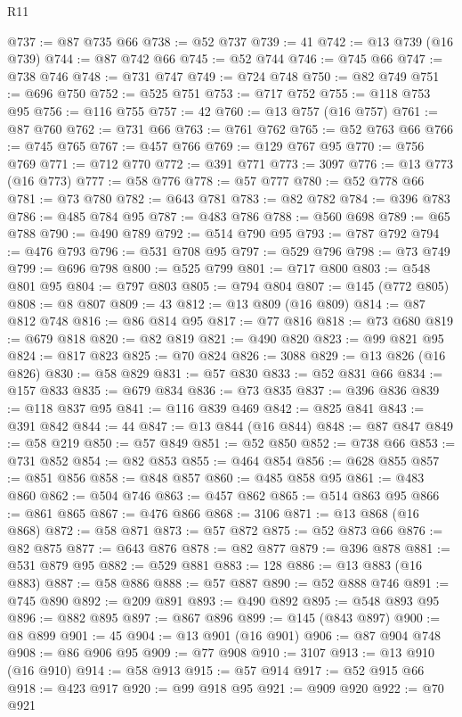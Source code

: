 \begin{lexlean}{R11}
\begin{coremodule}
@737 := @87 @735 @66
@738 := @52 @737
@739 := 41
@742 := @13 @739 (@16 @739)
@744 := @87 @742 @66
@745 := @52 @744
@746 := @745 @66
@747 := @738 @746
@748 := @731 @747
@749 := @724 @748
@750 := @82 @749
@751 := @696 @750
@752 := @525 @751
@753 := @717 @752
@755 := @118 @753 @95
@756 := @116 @755
@757 := 42
@760 := @13 @757 (@16 @757)
@761 := @87 @760
@762 := @731 @66
@763 := @761 @762
@765 := @52 @763 @66
@766 := @745 @765
@767 := @457 @766
@769 := @129 @767 @95
@770 := @756 @769
@771 := @712 @770
@772 := @391 @771
@773 := 3097
@776 := @13 @773 (@16 @773)
@777 := @58 @776
@778 := @57 @777
@780 := @52 @778 @66
@781 := @73 @780
@782 := @643 @781
@783 := @82 @782
@784 := @396 @783
@786 := @485 @784 @95
@787 := @483 @786
@788 := @560 @698
@789 := @65 @788
@790 := @490 @789
@792 := @514 @790 @95
@793 := @787 @792
@794 := @476 @793
@796 := @531 @708 @95
@797 := @529 @796
@798 := @73 @749
@799 := @696 @798
@800 := @525 @799
@801 := @717 @800
@803 := @548 @801 @95
@804 := @797 @803
@805 := @794 @804
@807 := @145 (@772 @805)
@808 := @8 @807
@809 := 43
@812 := @13 @809 (@16 @809)
@814 := @87 @812 @748
@816 := @86 @814 @95
@817 := @77 @816
@818 := @73 @680
@819 := @679 @818
@820 := @82 @819
@821 := @490 @820
@823 := @99 @821 @95
@824 := @817 @823
@825 := @70 @824
@826 := 3088
@829 := @13 @826 (@16 @826)
@830 := @58 @829
@831 := @57 @830
@833 := @52 @831 @66
@834 := @157 @833
@835 := @679 @834
@836 := @73 @835
@837 := @396 @836
@839 := @118 @837 @95
@841 := @116 @839 @469
@842 := @825 @841
@843 := @391 @842
@844 := 44
@847 := @13 @844 (@16 @844)
@848 := @87 @847
@849 := @58 @219
@850 := @57 @849
@851 := @52 @850
@852 := @738 @66
@853 := @731 @852
@854 := @82 @853
@855 := @464 @854
@856 := @628 @855
@857 := @851 @856
@858 := @848 @857
@860 := @485 @858 @95
@861 := @483 @860
@862 := @504 @746
@863 := @457 @862
@865 := @514 @863 @95
@866 := @861 @865
@867 := @476 @866
@868 := 3106
@871 := @13 @868 (@16 @868)
@872 := @58 @871
@873 := @57 @872
@875 := @52 @873 @66
@876 := @82 @875
@877 := @643 @876
@878 := @82 @877
@879 := @396 @878
@881 := @531 @879 @95
@882 := @529 @881
@883 := 128
@886 := @13 @883 (@16 @883)
@887 := @58 @886
@888 := @57 @887
@890 := @52 @888 @746
@891 := @745 @890
@892 := @209 @891
@893 := @490 @892
@895 := @548 @893 @95
@896 := @882 @895
@897 := @867 @896
@899 := @145 (@843 @897)
@900 := @8 @899
@901 := 45
@904 := @13 @901 (@16 @901)
@906 := @87 @904 @748
@908 := @86 @906 @95
@909 := @77 @908
@910 := 3107
@913 := @13 @910 (@16 @910)
@914 := @58 @913
@915 := @57 @914
@917 := @52 @915 @66
@918 := @423 @917
@920 := @99 @918 @95
@921 := @909 @920
@922 := @70 @921

\end{coremodule}
\end{lexlean}
